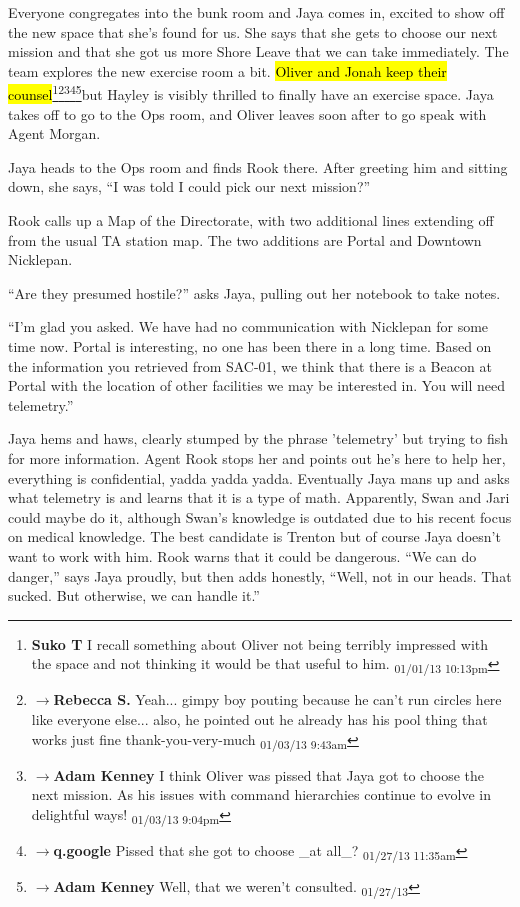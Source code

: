 
Everyone congregates into the bunk room and Jaya comes in, excited to show off the new space that she's found for us.  She says that she gets to choose our next mission and that she got us more Shore Leave that we can take immediately.  The team explores the new exercise room a bit.  \hl{Oliver and Jonah keep their counsel}\footnote{\textbf{Suko T }I recall something about Oliver not being terribly impressed with the space and not thinking it would be that useful to him. \textsubscript{01/01/13 10:13pm}}\footnote{$\rightarrow$\textbf{Rebecca S. }Yeah... gimpy boy pouting because he can't run circles here like everyone else... also, he pointed out he already has his pool thing that works just fine thank-you-very-much \textsubscript{01/03/13 9:43am}}\footnote{$\rightarrow$\textbf{Adam Kenney }I think Oliver was pissed that Jaya got to choose the next mission.  As his issues with command hierarchies continue to evolve in delightful ways! \textsubscript{01/03/13 9:04pm}}\footnote{$\rightarrow$\textbf{q.google }Pissed that she got to choose \_at all\_? \textsubscript{01/27/13 11:35am}}\footnote{$\rightarrow$\textbf{Adam Kenney }Well, that we weren't consulted. \textsubscript{01/27/13 }}but Hayley is visibly thrilled to finally have an exercise space.  Jaya takes off to go to the Ops room, and Oliver leaves soon after to go speak with Agent Morgan.



Jaya heads to the Ops room and finds Rook there.  After greeting him and sitting down, she says, ``I was told I could pick our next mission?''



Rook calls up a Map of the Directorate, with two additional lines extending off from the usual TA station map.  The two additions are Portal and Downtown Nicklepan.

``Are they presumed hostile?'' asks Jaya, pulling out her notebook to take notes.

``I'm glad you asked.  We have had no communication with Nicklepan for some time now.  Portal is interesting, no one has been there in a long time.  Based on the information you retrieved from SAC-01, we think that there is a Beacon at Portal with the location of other facilities we may be interested in.  You will need telemetry.''



Jaya hems and haws, clearly stumped by the phrase 'telemetry' but trying to fish for more information.  Agent Rook stops her and points out he's here to help her, everything is confidential, yadda yadda yadda.  Eventually Jaya mans up and asks what telemetry is and learns that it is a type of math. Apparently, Swan and Jari could maybe do it, although Swan's knowledge is outdated due to his recent focus on medical knowledge.  The best candidate is Trenton but of course Jaya doesn't want to work with him.  Rook warns that it could be dangerous.  ``We can do danger,'' says Jaya proudly, but then adds honestly, ``Well, not in our heads.  That sucked.  But otherwise, we can handle it.''



